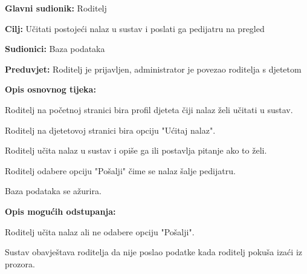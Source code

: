 						\noindent {}
					\begin{packed_item}
						
						\item \textbf{Glavni sudionik: }Roditelj
						\item  \textbf{Cilj:} Učitati postojeći nalaz u sustav i poslati ga pedijatru na pregled
						\item  \textbf{Sudionici:} Baza podataka
						\item  \textbf{Preduvjet:} Roditelj je prijavljen, administrator je povezao roditelja s djetetom
						\item  \textbf{Opis osnovnog tijeka:}
						
						\item[] \begin{packed_enum}
							
							\item Roditelj na početnoj stranici bira profil djeteta čiji nalaz želi učitati u sustav.
							\item Roditelj na djetetovoj stranici bira opciju "Ućitaj nalaz".
							\item Roditelj učita nalaz u sustav i opiše ga ili postavlja pitanje ako to želi.
							\item Roditelj odabere opciju "Pošalji" čime se nalaz šalje pedijatru.
							\item Baza podataka se ažurira.
						\end{packed_enum}
						
						\item  \textbf{Opis mogućih odstupanja:}
						
						\item[] \begin{packed_item}
							
							\item[4.a] Roditelj učita nalaz ali ne odabere opciju "Pošalji".
							\item[] \begin{packed_enum}
								
								\item Sustav obavještava roditelja da nije poslao podatke kada roditelj pokuša izaći iz prozora.
							\end{packed_enum}
							
							
						\end{packed_item}
					\end{packed_item}
					
